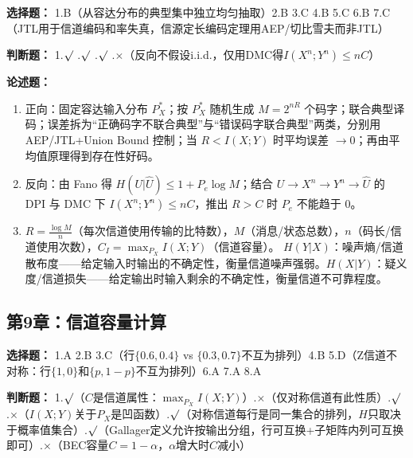 \documentclass[12pt,a4paper]{ctexart}
\begin{document}
\textbf{选择题：} 1.B（从容达分布的典型集中独立均匀抽取）\quad 2.B \quad 3.C \quad 4.B \quad 5.C \quad 6.B \quad 7.C（JTL用于信道编码和率失真，信源定长编码定理用AEP/切比雪夫而非JTL）

\textbf{判断题：} 1.$\surd$ .$\surd$ .$\surd$ .$\times$（反向不假设i.i.d.，仅用DMC得$I(X^n;Y^n)\leq nC$）

\textbf{论述题：}
\begin{enumerate}[leftmargin=*]
\item[(1)] 正向：固定容达输入分布 $P_X^*$；按 $P_X^*$ 随机生成 $M=2^{nR}$ 个码字；联合典型译码；误差拆为“正确码字不联合典型”与“错误码字联合典型”两类，分别用 AEP/JTL+Union Bound 控制；当 $R<I(X;Y)$ 时平均误差 $\to0$；再由平均值原理得到存在性好码。
\item[(2)] 反向：由 Fano 得 $H(U|\hat U)\leq 1+P_e\log M$；结合 $U\to X^n\to Y^n\to\hat U$ 的 DPI 与 DMC 下 $I(X^n;Y^n)\leq nC$，推出 $R>C$ 时 $P_e$ 不能趋于 0。
\item[(3)] $R=\frac{\log M}{n}$（每次信道使用传输的比特数），$M$（消息/状态总数），$n$（码长/信道使用次数），$C_I=\max_{P_X}I(X;Y)$（信道容量）。
$H(Y|X)$：噪声熵/信道散布度——给定输入时输出的不确定性，衡量信道噪声强弱。$H(X|Y)$：疑义度/信道损失——给定输出时输入剩余的不确定性，衡量信道不可靠程度。
\end{enumerate}

\subsection*{第9章：信道容量计算}

\textbf{选择题：} 1.A \quad 2.B \quad 3.C（行$\{0.6,0.4\}$ vs $\{0.3,0.7\}$不互为排列）\quad 4.B \quad 5.D（Z信道不对称：行$\{1,0\}$和$\{p,1-p\}$不互为排列）\quad 6.A \quad 7.A \quad 8.A

\textbf{判断题：}
1.$\surd$（$C$是信道属性：$\max_{P_X}I(X;Y)$）.$\times$（仅对称信道有此性质）.$\surd$ .$\times$（$I(X;Y)$关于$P_X$是凹函数）.$\surd$（对称信道每行是同一集合的排列，$H$只取决于概率值集合）.$\surd$（Gallager定义允许按输出分组，行可互换+子矩阵内列可互换即可）.$\times$（BEC容量$C=1-\alpha$，$\alpha$增大时$C$减小）
\end{document}
